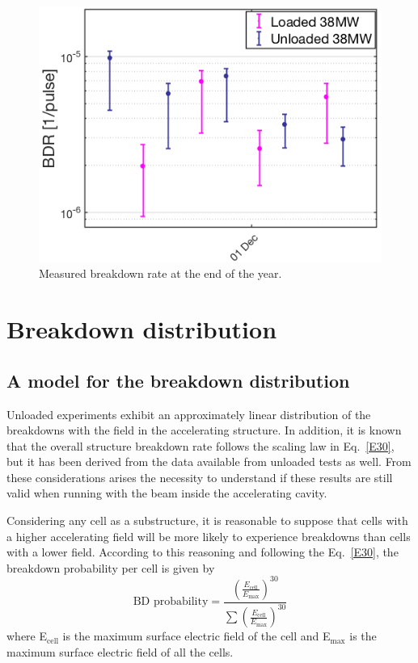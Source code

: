 \begin{figure}[h]
\centering 
\includegraphics[scale=0.55]{pictures/BDR_last_part_year.png}
\caption{Measured breakdown rate at the end of the year.}
\label{BD_prob_last_raise}
\end{figure}





\section[Breakdown distribution]{Breakdown distribution}

\subsection[A model for the breakdown distribution]{A model for the breakdown distribution}

Unloaded experiments exhibit an approximately linear distribution of the breakdowns with the field in the accelerating structure. In addition, it is known that the overall structure breakdown rate follows the scaling law in Eq.~\ref{E30}, but it has been derived from the data available from unloaded tests as well. From these considerations arises the necessity to understand if these results are still valid when running with the beam inside the accelerating cavity.

Considering any cell as a substructure, it is reasonable to suppose that cells with a higher accelerating field will be more likely to experience breakdowns than cells with a lower field. According to this reasoning and following the Eq.~\ref{E30}, the breakdown probability per cell is given by
\begin{equation}
\text{BD probability} =\frac{   \left ( \frac{E_\text{cell}}{E_\text{max}} \right )^{30} }{ \sum \left( \frac{E_\text{cell}}{E_\text{max}} \right )^{30}   } 
\end{equation}
where E$_\text{cell}$ is the maximum surface electric field of the cell and E$_\text{max}$ is the maximum surface electric field of all the cells. 

